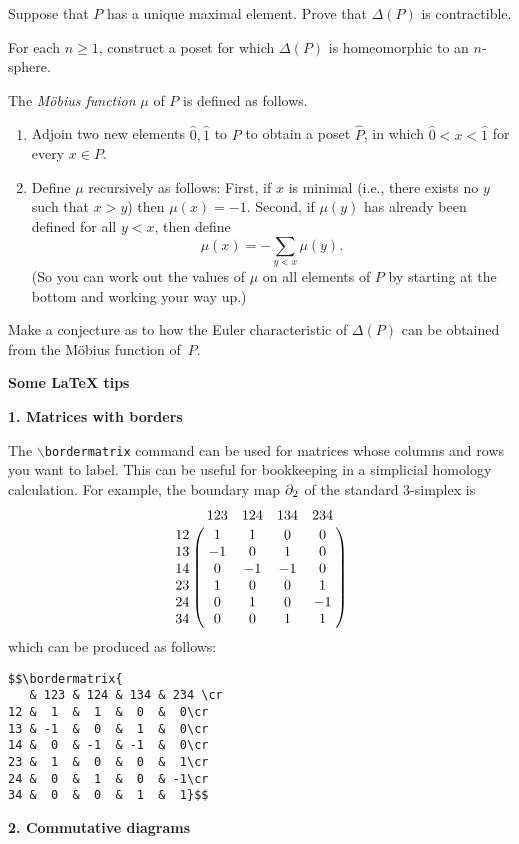 \probpart Suppose that $P$ has a unique maximal element.  Prove that $\Delta(P)$ is contractible.

\probpart For each $n\geq 1$, construct a poset for which $\Delta(P)$ is homeomorphic to an
$n$-sphere.

\probpart The \emph{M\"obius function} $\mu$ of $P$ is defined as follows.
\begin{enumerate}
\item Adjoin two new elements $\hat0,\hat1$ to $P$ to obtain a poset
$\hat P$, in which $\hat0<x<\hat1$ for every $x\in P$.
\item Define $\mu$ recursively as follows: First, if $x$ is minimal
(i.e., there exists no $y$ such that $x>y$) then $\mu(x)=-1$.
Second, if $\mu(y)$ has already been defined for all $y<x$, then define
  $$\mu(x)=-\sum_{y<x}\mu(y).$$
(So you can work out the values of $\mu$ on all elements of $P$
by starting at the bottom and working your way up.)
\end{enumerate}
Make a conjecture as to how the Euler characteristic
of $\Delta(P)$ can be obtained from the M\"obius function of~$P$.





\pagebreak

\textbf{\Large Some LaTeX tips}

\textbf{1. Matrices with borders}

The $\backslash$\texttt{bordermatrix} command
can be used for matrices whose columns and rows
you want to label.  This can be useful for bookkeeping
in a simplicial homology calculation.
For example, the boundary map $\partial_2$ of the standard 3-simplex
is
$$
\bordermatrix{
   & 123 & 124 & 134 & 234 \cr
12 &  1  &  1  &  0  &  0\cr
13 & -1  &  0  &  1  &  0\cr
14 &  0  & -1  & -1  &  0\cr
23 &  1  &  0  &  0  &  1\cr
24 &  0  &  1  &  0  & -1\cr
34 &  0  &  0  &  1  &  1
}
$$
which can be produced as follows:
\begin{verbatim}
$$\bordermatrix{
   & 123 & 124 & 134 & 234 \cr
12 &  1  &  1  &  0  &  0\cr
13 & -1  &  0  &  1  &  0\cr
14 &  0  & -1  & -1  &  0\cr
23 &  1  &  0  &  0  &  1\cr
24 &  0  &  1  &  0  & -1\cr
34 &  0  &  0  &  1  &  1}$$
\end{verbatim}

\textbf{2. Commutative diagrams}

